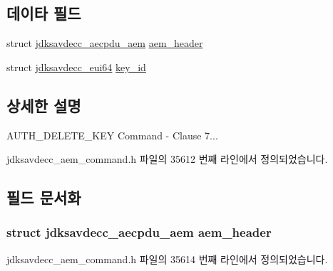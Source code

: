 \subsection*{데이타 필드}
\begin{DoxyCompactItemize}
\item 
struct \hyperlink{structjdksavdecc__aecpdu__aem}{jdksavdecc\+\_\+aecpdu\+\_\+aem} \hyperlink{structjdksavdecc__aem__command__auth__delete__key_ae1e77ccb75ff5021ad923221eab38294}{aem\+\_\+header}
\item 
struct \hyperlink{structjdksavdecc__eui64}{jdksavdecc\+\_\+eui64} \hyperlink{structjdksavdecc__aem__command__auth__delete__key_a37cbdf6056556ccfaee3ab01dc7c3032}{key\+\_\+id}
\end{DoxyCompactItemize}


\subsection{상세한 설명}
A\+U\+T\+H\+\_\+\+D\+E\+L\+E\+T\+E\+\_\+\+K\+EY Command -\/ Clause 7... 

jdksavdecc\+\_\+aem\+\_\+command.\+h 파일의 35612 번째 라인에서 정의되었습니다.



\subsection{필드 문서화}
\subsubsection[{\texorpdfstring{aem\+\_\+header}{aem_header}}]{\setlength{\rightskip}{0pt plus 5cm}struct {\bf jdksavdecc\+\_\+aecpdu\+\_\+aem} aem\+\_\+header}\hypertarget{structjdksavdecc__aem__command__auth__delete__key_ae1e77ccb75ff5021ad923221eab38294}{}\label{structjdksavdecc__aem__command__auth__delete__key_ae1e77ccb75ff5021ad923221eab38294}


jdksavdecc\+\_\+aem\+\_\+command.\+h 파일의 35614 번째 라인에서 정의되었습니다.

